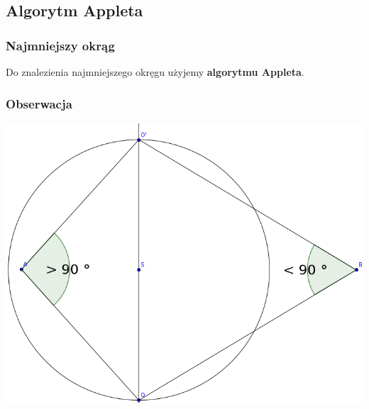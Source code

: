 \documentclass{beamer}
\begin{document}
\subsection{Algorytm Appleta}

\begin{frame}
\frametitle{Najmniejszy okrąg}
\begin{center}
Do znalezienia najmniejszego okręgu użyjemy \textbf{algorytmu Appleta}.
\end{center}

\end{frame}


\begin{frame}
\frametitle{Obserwacja}
\begin{center}
\includegraphics[width=0.65\paperwidth]{pics/angles.png}
\end{center}

\end{frame}

\end{document}
